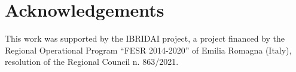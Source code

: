 \documentclass[11pt]{article}
\begin{document}


\section*{Acknowledgements}
This work was supported by the IBRIDAI project, a project financed by the Regional Operational Program “FESR 2014-2020” of Emilia Romagna (Italy), resolution of the Regional Council n. 863/2021.




\appendix


\end{document}
